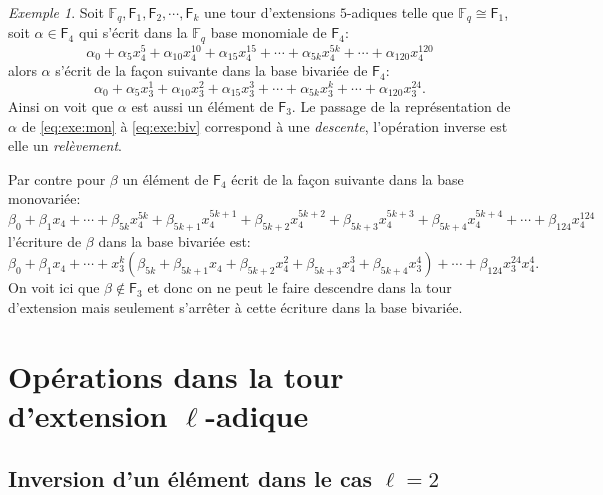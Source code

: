 \documentclass[10pt,a4paper]{book}
\theoremstyle{plain}
\theoremstyle{definition}
\theoremstyle{definition}
\theoremstyle{definition}
\theoremstyle{definition}
\theoremstyle{remark}
\theoremstyle{remark}
\newtheorem{exe}[thm]{Exemple}
\theoremstyle{definition}
\begin{document}
\begin{exe}
Soit $\mathbb{F}_q, \mathsf{F}_1, \mathsf{F}_2, \cdots, \mathsf{F}_k$ une tour d'extensions $5$-adiques telle que $\mathbb{F}_q \cong \mathsf{F}_1$, soit $\alpha \in \mathsf{F}_4$ qui s'écrit dans la $\mathbb{F}_q$ base monomiale de $\mathsf{F}_4$:
\begin{equation}
\label{eq:exe:mon}
\alpha_0 + \alpha_5x_4^5+ \alpha_{10}x_4^{10} + \alpha_{15}x_4^{15} + \cdots + \alpha_{5k}x_4^{5k} + \cdots + \alpha_{120}x_4^{120} 
\end{equation} 
alors $\alpha$ s'écrit de la façon suivante dans la base bivariée de $\mathsf{F}_4$:
\begin{equation}
\label{eq:exe:biv}
\alpha_0 + \alpha_5x_3^1+ \alpha_{10}x_3^{2} + \alpha_{15}x_3^{3} + \cdots + \alpha_{5k}x_3^{k} + \cdots + \alpha_{120}x_3^{24}. 
\end{equation} 
 Ainsi on voit que $\alpha$ est aussi un élément de $\mathsf{F}_3$. Le passage de la représentation de $\alpha$ de \eqref{eq:exe:mon} à \eqref{eq:exe:biv} correspond à une \emph{descente}, l'opération inverse est elle un \emph{relèvement}.
 
 Par contre pour $\beta$ un élément de $\mathsf{F}_4$ écrit de la façon suivante dans la base monovariée:
 \begin{equation*}
 \beta_0 + \beta_1 x_4+ \cdots +\beta_{5k}x_4^{5k} + \beta_{5k+1}x_4^{5k+1}+\beta_{5k+2}x_4^{5k+2}+ \beta_{5k+3}x_4^{5k+3}+ \beta_{5k+4}x_4^{5k+4}+ \cdots + \beta_{124}x_4^{124}
 \end{equation*}
l'écriture de $\beta$ dans la base bivariée est: 
 \begin{equation*}
  \beta_0 + \beta_1 x_4+ \cdots + x_3^{k}(\beta_{5k}+\beta_{5k+1} x_4 + \beta_{5k+2} x_4^2 + \beta_{5k+3} x_4^3 + \beta_{5k+4}x_3^4)+ \cdots + \beta_{124}x_3^{24}x_4^{4}.
 \end{equation*}
 On voit ici que $\beta \notin \mathsf{F}_3$ et donc on ne peut le faire descendre dans la tour d'extension mais seulement s'arrêter à cette écriture dans la base bivariée.
\end{exe}

\section{Opérations dans la tour d'extension $\ell$-adique}

\subsection*{Inversion d'un élément dans le cas $\ell=2$}
\end{document}
